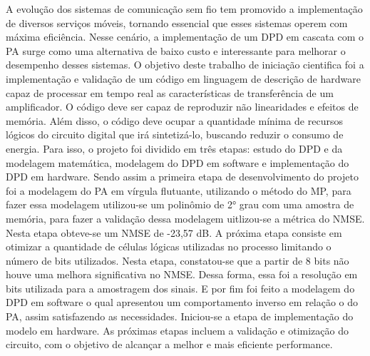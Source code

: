 A evolução dos sistemas de comunicação sem fio tem promovido a implementação de diversos serviços móveis, tornando essencial que esses sistemas operem com máxima eficiência. Nesse cenário, a implementação de um DPD em cascata com o PA surge como uma alternativa de baixo custo e interessante para melhorar o desempenho desses sistemas.
O objetivo deste trabalho de iniciação cientifica foi a implementação e validação de um código em linguagem de descrição de hardware capaz de processar em tempo real as características de transferência de um amplificador. O código deve ser capaz de reproduzir não linearidades e efeitos de memória. Além disso, o código deve ocupar a quantidade mínima de recursos lógicos do circuito digital que irá sintetizá-lo, buscando reduzir o consumo de energia. Para isso, o projeto foi dividido em três etapas: estudo do DPD e da modelagem matemática, modelagem do DPD em software e implementação do DPD em hardware.
Sendo assim a primeira etapa de desenvolvimento do projeto foi a modelagem do PA em vírgula flutuante, utilizando o método do MP, para fazer essa modelagem utilizou-se um polinômio de 2° grau com uma amostra de memória, para fazer a validação dessa modelagem uitlizou-se a métrica do NMSE. Nesta etapa obteve-se um NMSE de -23,57 dB. A próxima etapa consiste em otimizar a quantidade de células lógicas utilizadas no processo limitando o número de bits utilizados. Nesta etapa, constatou-se que a partir de 8 bits não houve uma melhora significativa no NMSE. Dessa forma, essa foi a resolução em bits utilizada para a amostragem dos sinais. E por fim foi feito a modelagem do DPD em software o qual apresentou um comportamento inverso em relação o do PA, assim satisfazendo as necessidades. Iniciou-se a etapa de implementação do modelo em hardware. As próximas etapas incluem a validação e otimização do circuito, com o objetivo de alcançar a melhor e mais eficiente performance.